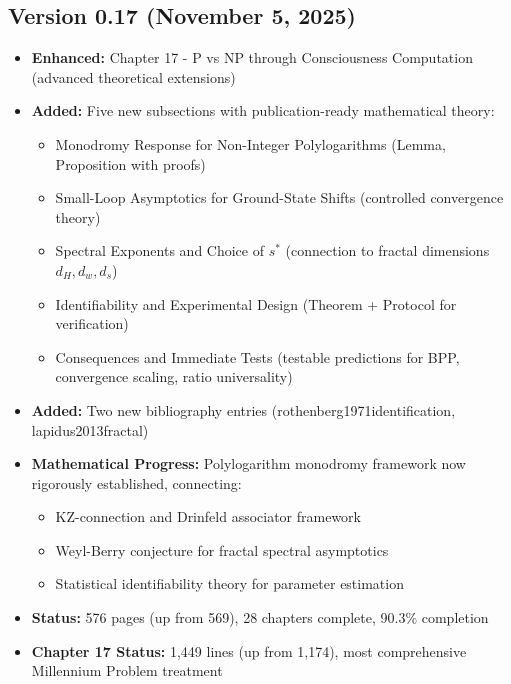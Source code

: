 \subsection*{Version 0.17 (November 5, 2025)}
\begin{itemize}
\item \textbf{Enhanced:} Chapter 17 - P vs NP through Consciousness Computation (advanced theoretical extensions)
\item \textbf{Added:} Five new subsections with publication-ready mathematical theory:
  \begin{itemize}
  \item Monodromy Response for Non-Integer Polylogarithms (Lemma, Proposition with proofs)
  \item Small-Loop Asymptotics for Ground-State Shifts (controlled convergence theory)
  \item Spectral Exponents and Choice of $s^*$ (connection to fractal dimensions $d_H, d_w, d_s$)
  \item Identifiability and Experimental Design (Theorem + Protocol for verification)
  \item Consequences and Immediate Tests (testable predictions for BPP, convergence scaling, ratio universality)
  \end{itemize}
\item \textbf{Added:} Two new bibliography entries (rothenberg1971identification, lapidus2013fractal)
\item \textbf{Mathematical Progress:} Polylogarithm monodromy framework now rigorously established, connecting:
  \begin{itemize}
  \item KZ-connection and Drinfeld associator framework
  \item Weyl-Berry conjecture for fractal spectral asymptotics
  \item Statistical identifiability theory for parameter estimation
  \end{itemize}
\item \textbf{Status:} 576 pages (up from 569), 28 chapters complete, 90.3\% completion
\item \textbf{Chapter 17 Status:} 1,449 lines (up from 1,174), most comprehensive Millennium Problem treatment
\end{itemize}

